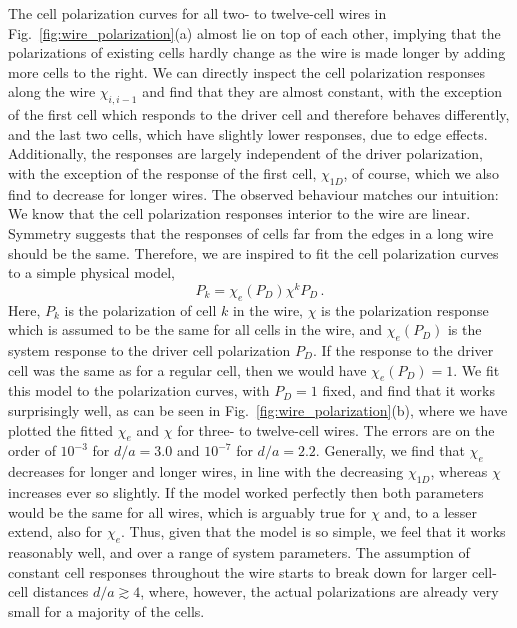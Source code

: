 The cell polarization curves for all two- to twelve-cell wires in
Fig.~\ref{fig:wire_polarization}(a) almost lie on top of each other, implying
that the polarizations of existing cells hardly change as the wire is made
longer by adding more cells to the right. We can directly inspect the cell
polarization responses along the wire $\chi_{i,i-1}$ and find that they are
almost constant, with the exception of the first cell which responds to the
driver cell and therefore behaves differently, and the last two cells, which
have slightly lower responses, due to edge effects. Additionally, the responses
are largely independent of the driver polarization, with the exception of the
response of the first cell, $\chi_{1D}$, of course, which we also find to
decrease for longer wires. The observed behaviour matches our intuition: We
know that the cell polarization responses interior to the wire are linear.
Symmetry suggests that the responses of cells far from the edges in a long wire
should be the same. Therefore, we are inspired to fit the cell polarization
curves to a simple physical model, 
%
\begin{equation}
  \label{eq:simple_model}
  P_k = \chi_e(P_D) \chi^k P_D \, .
\end{equation}
%
Here, $P_k$ is the polarization of cell $k$ in the wire, $\chi$ is the
polarization response which is assumed to be the same for all cells in the wire,
and $\chi_e(P_D)$ is the system response to the driver cell polarization $P_D$.
If the response to the driver cell was the same as for a regular cell, then we
would have $\chi_e(P_D) = 1$. We fit this model to the polarization curves,
with $P_D = 1$ fixed, and find that it works surprisingly well, as can be seen
in Fig.~\ref{fig:wire_polarization}(b), where we have plotted the fitted
$\chi_e$ and $\chi$ for three- to twelve-cell wires. The errors are on the order
of $10^{-3}$ for $d/a = 3.0$ and $10^{-7}$ for $d/a = 2.2$. Generally, we find
that $\chi_e$ decreases for longer and longer wires, in line with the decreasing
$\chi_{1D}$, whereas $\chi$ increases ever so slightly. If the model worked
perfectly then both parameters would be the same for all wires, which is
arguably true for $\chi$ and, to a lesser extend, also for $\chi_e$. Thus, given
that the model is so simple, we feel that it works reasonably well, and over a
range of system parameters. The assumption of constant cell responses throughout
the wire starts to break down for larger cell-cell distances $d/a \gtrsim 4$,
where, however, the actual polarizations are already very small for a majority
of the cells.

